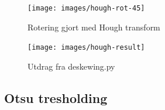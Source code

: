 \documentclass{article}
\begin{document}
\begin{figure}[h]
\centering
\texttt{[image: images/hough-rot-45]}
\caption{Rotering gjort med Hough transform}
\label{fig:hough-45}
\end{figure}


\begin{figure}[h]
\centering
\texttt{[image: images/hough-result]}
\caption{Utdrag fra deskewing.py}
\label{fig:hough-result}
\end{figure}


\subsection{Otsu tresholding}
\end{document}
